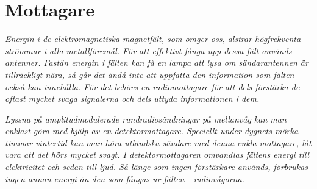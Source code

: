 \section{Mottagare}
\label{mottagare}

\emph{Energin i de elektromagnetiska magnetfält, som omger oss,
  alstrar högfrekventa strömmar i alla metallföremål. För att
  effektivt fånga upp dessa fält används antenner.  Fastän energin i
  fälten kan få en lampa att lysa om sändarantennen är tillräckligt
  nära, så går det ändå inte att uppfatta den information som fälten
  också kan innehålla.  För det behövs en radiomottagare för att dels
  förstärka de oftast mycket svaga signalerna och dels uttyda
  informationen i dem.}

\emph{Lyssna på amplitudmodulerade rundradiosändningar på mellanvåg
  kan man enklast göra med hjälp av en detektormottagare. Speciellt
  under dygnets mörka timmar vintertid kan man höra utländska sändare
  med denna enkla mottagare, låt vara att det hörs mycket svagt. I
  detektormottagaren omvandlas fältens energi till elektricitet och
  sedan till ljud. Så länge som ingen förstärkare används, förbrukas
  ingen annan energi än den som fångas ur fälten - radiovågorna.}
